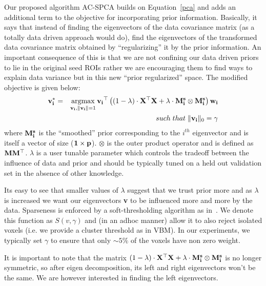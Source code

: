 \documentclass{llncs}
\newcommand{\argmax}{\operatornamewithlimits{argmax}}
\begin{document}
Our proposed algorithm AC-SPCA builds on Equation~\ref{pca} and adds an additional term to the objective for incorporating prior information. Basically, it says that instead of finding the eigenvectors of the data covariance matrix (as a totally data driven approach would do), find the eigenvectors of the transformed data covariance matrix obtained by ``regularizing'' it by the prior information. An important consequence of this is that we are not confining our data driven priors to lie in the original seed ROIs rather we are encouraging them to find ways to explain data variance but in this new ``prior regularized'' space. The modified objective is given below:
\begin{eqnarray}
\label{ppca}
{\bf v_i^*}&=& \argmax_{{\bf v_i},{\bf \|v_i\|}=1} {\bf v_i}^{\top}\left((1-\lambda)\cdot{\bf X^{\top}X +  \lambda\cdot M^s_i\otimes M^s_i}\right){\bf w_i}  \\
\nonumber
&&such\;that\;\|{\bf v_i}\|_0=\gamma
\end{eqnarray}
where ${\bf M^s_i}$ is  the ``smoothed'' prior corresponding to the $i^{th}$ eigenvector and is itself a vector of size (${\bf 1\times p}$). $\otimes$ is the outer product operator and is defined as $\bf MM^{\top}$.  $\lambda$ is a user tunable parameter which controls the tradeoff between the influence of data and prior and should be typically tuned on a held out validation set in the absence of other knowledge. 

Its easy to see that smaller values of $\lambda$ suggest that we trust prior more and as $\lambda$ is increased we want our eigenvectors {\bf v} to be influenced more and more by the data. Sparseness is enforced by a soft-thresholding algorithm as in~\cite{zou2006sparse,Witten2009b}. We denote this function as $S(v,\gamma)$ and (in an adhoc manner) allow it to also reject isolated voxels (i.e. we provide a cluster threshold as in VBM). In our experiments, we typically set $\gamma$ to ensure that only $\sim5\%$ of the voxels have non zero weight.


 It is important to note that the matrix ${(1-\lambda)\cdot \bf X^{\top}X +  \lambda\cdot M^s_i\otimes M^s_i}$ is no longer symmetric, so after eigen decomposition, its left and right eigenvectors won't be the same. We are however interested in finding the left eigenvectors. 

\end{document}
